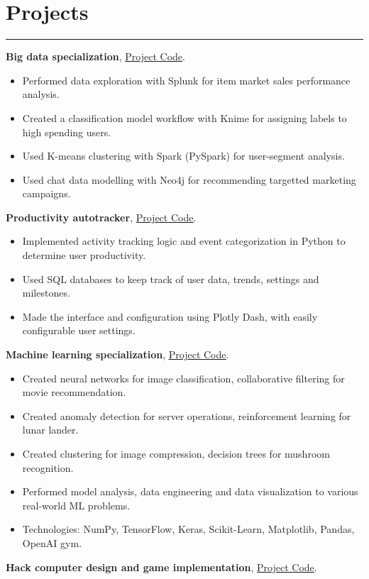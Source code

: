 \documentclass[a4paper,10pt]{article}
\newcommand{\ulink}[2]{\href{#1}{\underline{#2}}}
\begin{document}
\section*{Projects}
\hrule
\vspace{2mm}
\textbf{Big data specialization}, \ulink{https://github.com/rokobo/Big-Data-Specialization}{Project Code}.
\begin{itemize}[itemsep=0pt]
  \item Performed data exploration with Splunk for item market sales performance analysis.
  \item Created a classification model workflow with Knime for assigning labels to high spending users.
  \item Used K-means clustering with Spark (PySpark) for user-segment analysis.
  \item Used chat data modelling with Neo4j for recommending targetted marketing campaigns.
\end{itemize}
\textbf{Productivity autotracker}, \ulink{https://github.com/rokobo/Productivity-autotracker}{Project Code}.
\begin{itemize}[itemsep=0pt]
  \item Implemented activity tracking logic and event categorization in Python to determine user productivity.
  \item Used SQL databases to keep track of user data, trends, settings and milestones.
  \item Made the interface and configuration using Plotly Dash, with easily configurable user settings.
\end{itemize}
\textbf{Machine learning specialization}, \ulink{https://github.com/rokobo/Machine-learning-specialization}{Project Code}.
\begin{itemize}[itemsep=0pt]
  \item Created neural networks for image classification, collaborative filtering for movie recommendation.
  \item Created anomaly detection for server operations, reinforcement learning for lunar lander.
  \item Created clustering for image compression, decision trees for mushroom recognition.
  \item Performed model analysis, data engineering and data visualization to various real-world ML problems.
  \item Technologies: NumPy, TensorFlow, Keras, Scikit-Learn, Matplotlib, Pandas, OpenAI gym.
\end{itemize}
\textbf{Hack computer design and game implementation}, \ulink{https://github.com/rokobo/From-Nand-gates-to-Tetris-implementation}{Project Code}.
\end{document}
